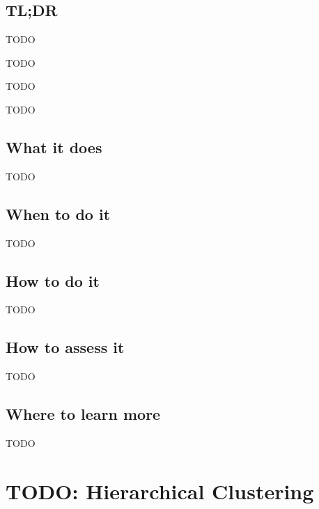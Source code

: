 \documentclass[
]{book}
\providecommand{\tightlist}{%
  \setlength{\itemsep}{0pt}\setlength{\parskip}{0pt}}
\begin{document}
\hypertarget{tldr-21}{%
\section{TL;DR}\label{tldr-21}}

\begin{description}
\tightlist
\item[What it does]
TODO
\item[When to do it]
TODO
\item[How to do it]
TODO
\item[How to assess it]
TODO
\end{description}

\hypertarget{what-it-does-21}{%
\section{What it does}\label{what-it-does-21}}

TODO

\hypertarget{when-to-do-it-21}{%
\section{When to do it}\label{when-to-do-it-21}}

TODO

\hypertarget{how-to-do-it-21}{%
\section{How to do it}\label{how-to-do-it-21}}

TODO

\hypertarget{how-to-assess-it-21}{%
\section{How to assess it}\label{how-to-assess-it-21}}

TODO

\hypertarget{where-to-learn-more-21}{%
\section{Where to learn more}\label{where-to-learn-more-21}}

TODO

\hypertarget{hierarchical-clustering}{%
\chapter{TODO: Hierarchical Clustering}\label{hierarchical-clustering}}
\end{document}
